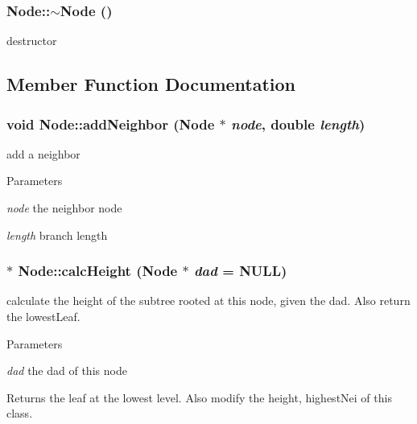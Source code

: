 \hypertarget{classNode_aa0840c3cb5c7159be6d992adecd2097c}{
\subsubsection[{$\sim$Node}]{\setlength{\rightskip}{0pt plus 5cm}Node::$\sim$Node ()}}
\label{classNode_aa0840c3cb5c7159be6d992adecd2097c}
destructor 

\subsection{Member Function Documentation}
\hypertarget{classNode_abd8e9dbecc4ad76fdebefbb1b578b6f0}{
\subsubsection[{addNeighbor}]{\setlength{\rightskip}{0pt plus 5cm}void Node::addNeighbor ({\bf Node} $\ast$ {\em node}, \/  double {\em length})}}
\label{classNode_abd8e9dbecc4ad76fdebefbb1b578b6f0}
add a neighbor 
\begin{DoxyParams}{Parameters}
\item[{\em node}]the neighbor node \item[{\em length}]branch length \end{DoxyParams}
\hypertarget{classNode_a1340ab80fa547e2f09e766a4c327f387}{
\subsubsection[{calcHeight}]{ $\ast$ Node::calcHeight ({\bf Node} $\ast$ {\em dad} = {\ttfamily NULL})}}
\label{classNode_a1340ab80fa547e2f09e766a4c327f387}
calculate the height of the subtree rooted at this node, given the dad. Also return the lowestLeaf. 
\begin{DoxyParams}{Parameters}
\item[{\em dad}]the dad of this node \end{DoxyParams}
\begin{DoxyReturn}{Returns}
the leaf at the lowest level. Also modify the height, highestNei of this class. 
\end{DoxyReturn}
